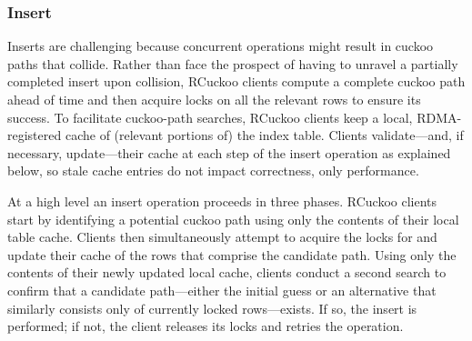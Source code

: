 \subsubsection{Insert}
\label{sec:insert}

Inserts are challenging because concurrent operations might result in
cuckoo paths that collide.  Rather than face the prospect of having to
unravel a partially completed insert upon collision, RCuckoo clients
compute a complete cuckoo path ahead of time and then acquire locks on
all the relevant rows to ensure its success.  To facilitate
cuckoo-path searches, RCuckoo clients keep a local, RDMA-registered
cache of (relevant portions of) the index table.  Clients
validate---and, if necessary, update---their cache at each step of the
insert operation as explained below, so stale cache entries do not
impact correctness, only performance.







At a high level an insert operation proceeds in three phases.  RCuckoo
clients start by identifying a potential cuckoo path using only the
contents of their local table cache.  Clients then simultaneously
attempt to acquire the locks for and update their cache of the rows
that comprise the candidate path.  Using only the contents of their
newly updated local cache, clients conduct a second search to confirm
that a candidate path---either the initial guess or an alternative
that similarly consists only of currently locked rows---exists.  If
so, the insert is performed; if not, the client releases its locks and
retries the operation.

